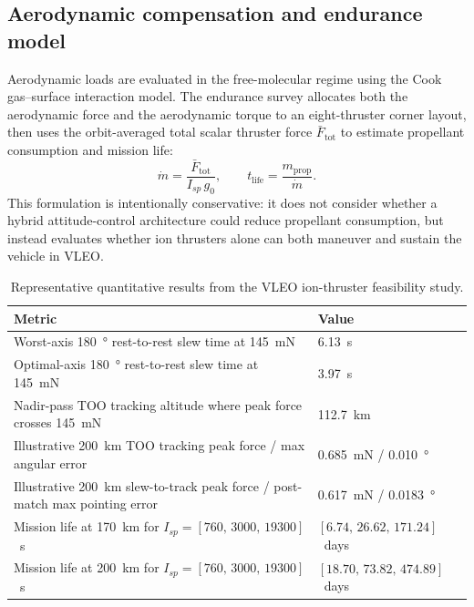 \documentclass[conf]{new-aiaa}
\begin{document}
\subsection{Aerodynamic compensation and endurance model} \label{subsec:aero_model}

Aerodynamic loads are evaluated in the free-molecular regime using the Cook gas--surface interaction model. The endurance survey allocates both the aerodynamic force and the aerodynamic torque to an eight-thruster corner layout, then uses the orbit-averaged total scalar thruster force $\bar{F}_{\mathrm{tot}}$ to estimate propellant consumption and mission life:
\begin{equation}
    \dot{m} = \frac{\bar{F}_{\mathrm{tot}}}{I_{sp}\, g_0},
    \qquad
    t_{\mathrm{life}} = \frac{m_{\mathrm{prop}}}{\dot{m}}.
    \label{eq:life}
\end{equation}
This formulation is intentionally conservative: it does not consider whether a hybrid attitude-control architecture could reduce propellant consumption, but instead evaluates whether ion thrusters alone can both maneuver and sustain the vehicle in VLEO.


\begin{table}[!htb]
\caption{Representative quantitative results from the VLEO ion-thruster feasibility study.}
\label{tab:key-results}
\centering
\begin{tabular}{p{}p{}}
\toprule
Metric & Value \\
\midrule
Worst-axis \SI{180}{\degree} rest-to-rest slew time at \SI{145}{\milli\newton} & \SI{6.13}{\second} \\
Optimal-axis \SI{180}{\degree} rest-to-rest slew time at \SI{145}{\milli\newton} & \SI{3.97}{\second} \\
Nadir-pass TOO tracking altitude where peak force crosses \SI{145}{\milli\newton} & \SI{112.7}{\kilo\meter} \\
Illustrative \SI{200}{\kilo\meter} TOO tracking peak force / max angular error & \SI{0.685}{\milli\newton} / \SI{0.010}{\degree} \\
Illustrative \SI{200}{\kilo\meter} slew-to-track peak force / post-match max pointing error & \SI{0.617}{\milli\newton} / \SI{0.0183}{\degree} \\
Mission life at \SI{170}{\kilo\meter} for $I_{sp} = [760,\, 3000,\, 19300]$~s & $[6.74,\, 26.62,\, 171.24]$~days \\
Mission life at \SI{200}{\kilo\meter} for $I_{sp} = [760,\, 3000,\, 19300]$~s & $[18.70,\, 73.82,\, 474.89]$~days \\
\bottomrule
\end{tabular}
\end{table}
\end{document}
